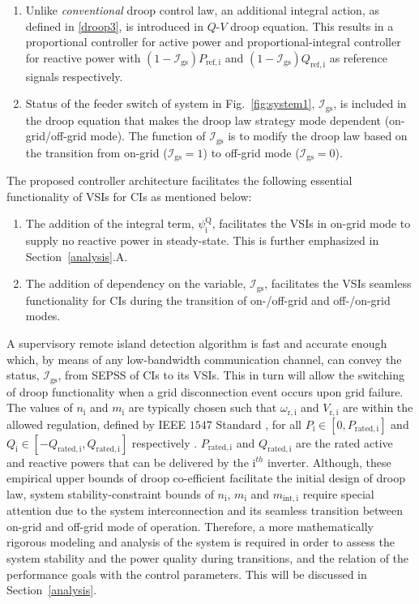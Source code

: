 \documentclass[journal]{IEEEtran}
\begin{document}
\begin{enumerate}
    \item Unlike \textit{conventional} droop control law, an additional integral action, as defined in \eqref{droop3}, is introduced in $Q$-$V$ droop equation. This results in a proportional controller for active power and proportional-integral controller for reactive power with $(1-\mathcal{I}_\mathrm{gs})P_\mathrm{ref,i}$ and $(1-\mathcal{I}_\mathrm{gs})Q_\mathrm{ref,i}$ as reference signals respectively.
    \item Status of the feeder switch of system in Fig.~\ref{fig:system1}, $\mathcal{I}_\mathrm{gs}$, is included in the droop equation that makes the droop law strategy mode dependent (on-grid/off-grid mode). The function of $\mathcal{I}_\mathrm{gs}$ is to modify the droop law based on the transition from on-grid ($\mathcal{I}_\mathrm{gs}=1$) to off-grid mode ($\mathcal{I}_\mathrm{gs}=0$).
\end{enumerate}
The proposed controller architecture facilitates  the following essential functionality of VSIs for CIs as mentioned below:
\begin{enumerate}
\item The addition of the integral term, $\psi^\mathrm{Q}_\mathrm{i}$, facilitates the VSIs in on-grid mode to supply no reactive power in steady-state. This is further emphasized in Section~\ref{analysis}.A.
\item The addition of dependency on the variable, $\mathcal{I}_\mathrm{gs}$, facilitates the VSIs seamless functionality for CIs during the transition of on-/off-grid and off-/on-grid modes.
\end{enumerate}
\par A supervisory remote island detection algorithm is fast and accurate enough which, by means of any low-bandwidth communication channel, can convey the status, $\mathcal{I}_\mathrm{gs}$, from SEPSS of CIs to its VSIs. This in turn will allow the switching of droop functionality when a grid disconnection event occurs upon grid failure. The values of $n_\mathrm{i}$ and $m_\mathrm{i}$ are typically chosen such that $\omega_\mathrm{r,i}$ and $V_\mathrm{r,i}$ are within the allowed regulation, defined by IEEE $1547$ Standard \cite{ieee1547}, for all $P_\mathrm{i} \in [0, P_\mathrm{rated,i}]$ and $Q_\mathrm{i} \in [-Q_\mathrm{rated,i}, Q_\mathrm{rated,i}]$ respectively \cite{sanjay}. $P_\mathrm{rated,i}$ and $Q_\mathrm{rated,i}$ are the rated active and reactive powers that can be delivered by the $\mathrm{i}^{th}$ inverter. Although, these empirical upper bounds of droop co-efficient facilitate the initial design of droop law, system stability-constraint bounds of $n_\mathrm{i}$, $m_\mathrm{i}$ and $m_\mathrm{int,i}$ require special attention due to the system interconnection and its seamless transition between on-grid and off-grid mode of operation. Therefore, a more mathematically rigorous modeling and analysis of the system is required in order to assess the system stability and the power quality during transitions, and the relation of the performance goals with the control parameters. This will be discussed in Section~\ref{analysis}.
\end{document}
